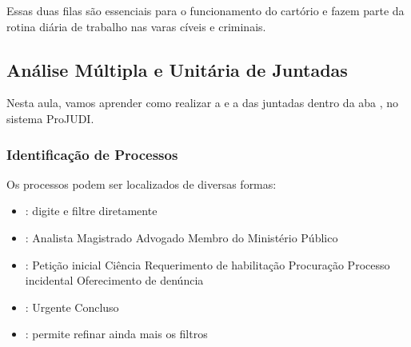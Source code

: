 \documentclass[letterpaper,10pt,brazil]{sphinxmanual}
\begin{document}
\sphinxAtStartPar
Essas duas filas são essenciais para o funcionamento do cartório e fazem parte da rotina diária de trabalho nas varas cíveis e criminais.

\sphinxstepscope


\subsection{Análise Múltipla e Unitária de Juntadas}
\label{\detokenize{projud_06_analisejuntada_multiplaeunitaria:analise-multipla-e-unitaria-de-juntadas}}\label{\detokenize{projud_06_analisejuntada_multiplaeunitaria::doc}}
\sphinxAtStartPar
Nesta aula, vamos aprender como realizar a  e a  das juntadas dentro da aba , no sistema ProJUDI.


\subsubsection{Identificação de Processos}
\label{\detokenize{projud_06_analisejuntada_multiplaeunitaria:identificacao-de-processos}}
\sphinxAtStartPar
Os processos podem ser localizados de diversas formas:
\begin{itemize}
\item {} 
\sphinxAtStartPar
{}: digite e filtre diretamente

\item {} 
\sphinxAtStartPar
{}:
\sphinxhyphen{} Analista
\sphinxhyphen{} Magistrado
\sphinxhyphen{} Advogado
\sphinxhyphen{} Membro do Ministério Público

\item {} 
\sphinxAtStartPar
{}:
\sphinxhyphen{} Petição inicial
\sphinxhyphen{} Ciência
\sphinxhyphen{} Requerimento de habilitação
\sphinxhyphen{} Procuração
\sphinxhyphen{} Processo incidental
\sphinxhyphen{} Oferecimento de denúncia

\item {} 
\sphinxAtStartPar
{}:
\sphinxhyphen{} Urgente
\sphinxhyphen{} Concluso

\item {} 
\sphinxAtStartPar
{}: permite refinar ainda mais os filtros

\end{itemize}
\end{document}

